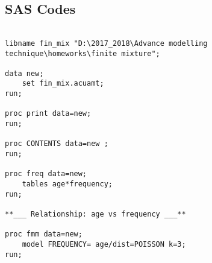\documentclass[a4paper, 12pt]{article}
\begin{document}

\subsection{SAS Codes }


\begin{verbatim}
                               
libname fin_mix "D:\2017_2018\Advance modelling
technique\homeworks\finite mixture";

data new;
    set fin_mix.acuamt;
run;

proc print data=new;
run;

proc CONTENTS data=new ;
run;

proc freq data=new;
    tables age*frequency;
run;

**___ Relationship: age vs frequency ___**

proc fmm data=new;
    model FREQUENCY= age/dist=POISSON k=3;
run;
\end{verbatim}
\end{document}
